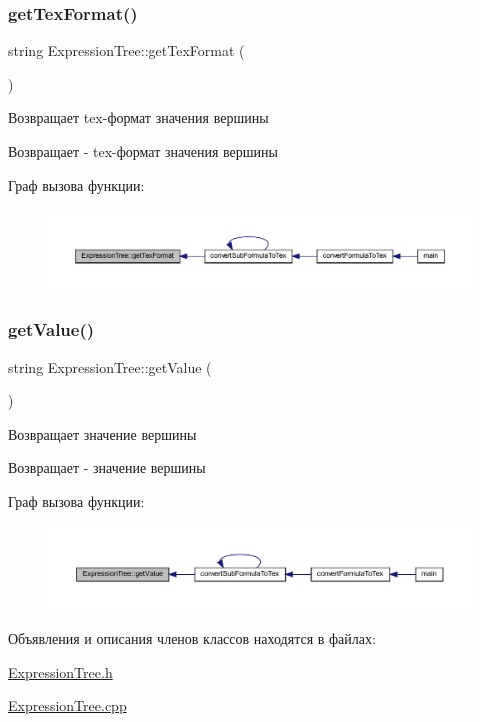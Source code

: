 \subsubsection{\texorpdfstring{get\+Tex\+Format()}{getTexFormat()}}
{\footnotesize\ttfamily string Expression\+Tree\+::get\+Tex\+Format (\begin{DoxyParamCaption}{ }\end{DoxyParamCaption})}



Возвращает tex-\/формат значения вершины 

\begin{DoxyReturn}{Возвращает}
-\/ tex-\/формат значения вершины 
\end{DoxyReturn}
Граф вызова функции\+:\nopagebreak
\begin{figure}[H]
\begin{center}
\leavevmode
\includegraphics[width=350pt]{class_expression_tree_a2ba380c9b6d05a259f7827269cce4aea_icgraph}
\end{center}
\end{figure}
\mbox{\label{class_expression_tree_ab8b29bfa5c593849c39becf1b501c80f}} 
\subsubsection{\texorpdfstring{get\+Value()}{getValue()}}
{\footnotesize\ttfamily string Expression\+Tree\+::get\+Value (\begin{DoxyParamCaption}{ }\end{DoxyParamCaption})}



Возвращает значение вершины 

\begin{DoxyReturn}{Возвращает}
-\/ значение вершины 
\end{DoxyReturn}
Граф вызова функции\+:\nopagebreak
\begin{figure}[H]
\begin{center}
\leavevmode
\includegraphics[width=350pt]{class_expression_tree_ab8b29bfa5c593849c39becf1b501c80f_icgraph}
\end{center}
\end{figure}


Объявления и описания членов классов находятся в файлах\+:\begin{DoxyCompactItemize}
\item 
\mbox{\hyperlink{_expression_tree_8h}{Expression\+Tree.\+h}}\item 
\mbox{\hyperlink{_expression_tree_8cpp}{Expression\+Tree.\+cpp}}\end{DoxyCompactItemize}
